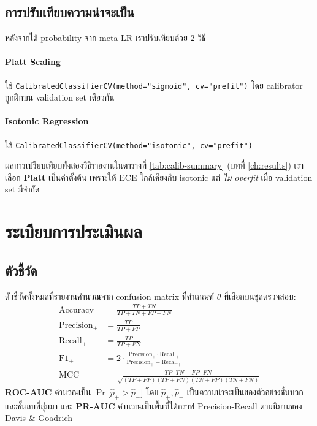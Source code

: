 \subsection{การปรับเทียบความน่าจะเป็น}

หลังจากได้ probability จาก meta-LR เราปรับเทียบด้วย 2 วิธี

\paragraph{Platt Scaling} ใช้ \texttt{CalibratedClassifierCV(method="sigmoid",
cv="prefit")} โดย calibrator ถูกฝึกบน validation set เดียวกัน

\paragraph{Isotonic Regression} ใช้ \texttt{CalibratedClassifierCV(method="isotonic",
cv="prefit")}

ผลการเปรียบเทียบทั้งสองวิธีรายงานในตารางที่ \ref{tab:calib-summary} (บทที่
\ref{ch:results}) เราเลือก \textbf{Platt} เป็นค่าตั้งต้น เพราะให้ ECE
ใกล้เคียงกับ isotonic แต่ \emph{ไม่ overfit} เมื่อ validation set มีจำกัด

\section{ระเบียบการประเมินผล}
\label{sec:method-eval}

\subsection{ตัวชี้วัด}

ตัวชี้วัดทั้งหมดที่รายงานคำนวณจาก confusion matrix ที่ค่าเกณฑ์ $\theta$
ที่เลือกบนชุดตรวจสอบ:
\begin{align}
\text{Accuracy}     &= \frac{TP + TN}{TP + TN + FP + FN} \label{eq:acc}\\
\text{Precision}_{+} &= \frac{TP}{TP + FP} \label{eq:prec}\\
\text{Recall}_{+}    &= \frac{TP}{TP + FN} \label{eq:recall}\\
\text{F1}_{+}        &= 2 \cdot \frac{\text{Precision}_{+} \cdot \text{Recall}_{+}}{\text{Precision}_{+} + \text{Recall}_{+}} \label{eq:f1}\\
\text{MCC}           &= \frac{TP \cdot TN - FP \cdot FN}{\sqrt{(TP+FP)(TP+FN)(TN+FP)(TN+FN)}} \label{eq:mcc}
\end{align}
\textbf{ROC-AUC} คำนวณเป็น $\Pr\!\bigl[\hat p_+ > \hat p_-\bigr]$ โดย $\hat p_+, \hat p_-$
เป็นความน่าจะเป็นของตัวอย่างชั้นบวกและชั้นลบที่สุ่มมา และ \textbf{PR-AUC}
คำนวณเป็นพื้นที่ใต้กราฟ Precision-Recall ตามนิยามของ Davis \& Goadrich

